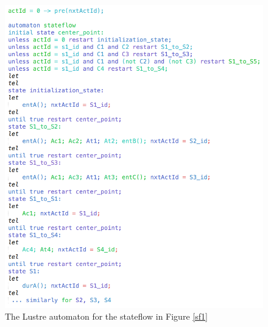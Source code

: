 \documentclass{article}
\begin{document}
\begin{figure}[h]
\begin{center}
  \includegraphics[scale=0.3]{figures/automaton} 
\end{center}  
  \caption{The Lustre automaton for the stateflow in Figure \ref{sf1}}
  \label{automaton}
\end{figure}
\end{document}
